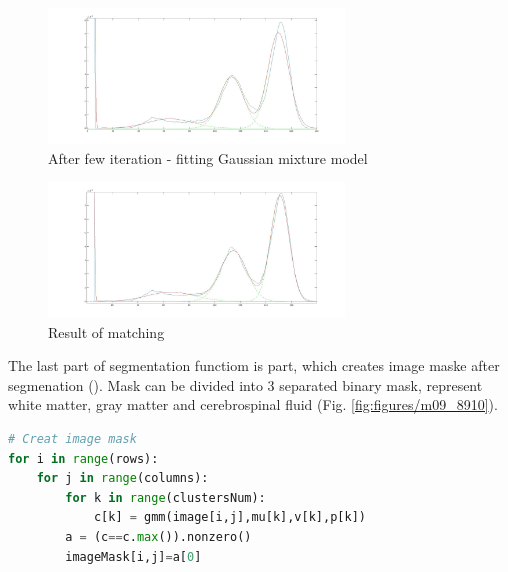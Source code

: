 \begin{figure}[H]
	\centering{}\includegraphics[width=0.7\textwidth]{figures/Module_09/m09_14}
	\caption{After few iteration - fitting Gaussian mixture model
	\label{fig:figures/m09_14}}
\end{figure} 

\begin{figure}[H]
	\centering{}\includegraphics[width=0.7\textwidth]{figures/Module_09/m09_15}
	\caption{Result of matching  
	\label{fig:figures/m09_15}}
\end{figure} 

The last part of segmentation functiom is part, which creates image maske after segmenation (). Mask can be divided into 3 separated binary mask, represent white matter, gray matter and cerebrospinal fluid (Fig. \ref{fig:figures/m09_8910}).

\begin{lstlisting}[language=Python, caption = Create image mask]
# Creat image mask        
for i in range(rows):
	for j in range(columns):
    	for k in range(clustersNum):
        	c[k] = gmm(image[i,j],mu[k],v[k],p[k])
        a = (c==c.max()).nonzero()
        imageMask[i,j]=a[0]
\end{lstlisting}


